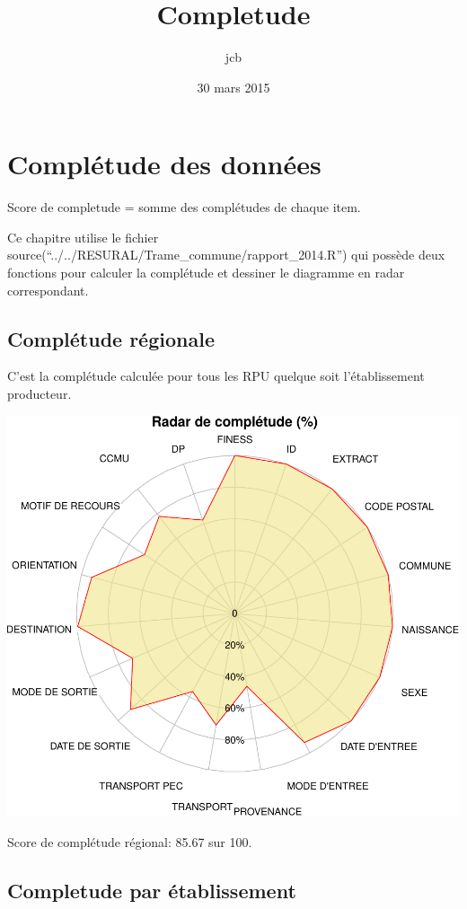 \documentclass[]{article}
\title{Completude}
\author{jcb}
\date{30 mars 2015}
\begin{document}
\maketitle


{
\hypersetup{linkcolor=black}
\setcounter{tocdepth}{2}
\tableofcontents
}
\section{Complétude des données}\label{completude-des-donnees}

Score de completude = somme des complétudes de chaque item.

Ce chapitre utilise le fichier
source(``../../RESURAL/Trame\_commune/rapport\_2014.R'') qui possède
deux fonctions pour calculer la complétude et dessiner le diagramme en
radar correspondant.

\subsection{Complétude régionale}\label{completude-regionale}

C'est la complétude calculée pour tous les RPU quelque soit
l'établissement producteur.

\includegraphics{completude_files/figure-latex/comp.regionale-1.pdf}

Score de complétude régional: 85.67 sur 100.

\subsection{Completude par
établissement}\label{completude-par-etablissement}
\end{document}
